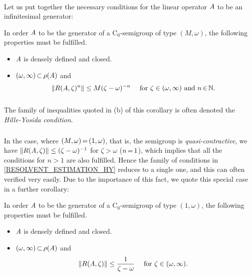 \documentclass[11pt,twoside]{article}
\begin{document}
\paragraph{}
Let us put together the necessary conditions for the linear operator $\mathit{A}$
to be an infinitesimal generator:

\begin{corollary}
In order $\mathit{A}$ to be the generator of a C$_0$-semigroup of type $(M,\omega)$,
the following properties must be fulfilled.

\begin{itemize}[leftmargin=15pt]
\item[(a)]
$\mathit{A}$ is densely defined and closed.
\item[(b)]
$(\omega,\infty) {\,\subset\,} \rho(\mathit{A})$ and
\begin{equation}\label{RESOLVENT_ESTIMATION_HY}
\left\lVert R(\mathit{A},\zeta)^n \right\rVert \leq M (\zeta - \omega)^{-n}
\quad \mbox{ for } \zeta \in (\omega,\infty) \mbox{ and } n {\,\in\,} {\mathbb{N}}.
\end{equation}
\end{itemize}
\end{corollary}

\subparagraph{}
The family of inequalities quoted in (b) of this corollary is often denoted
the \textit{Hille-Yosida condition}.

\subparagraph{}
In the case, where $(M,\omega) {\,=\,} (1,\omega)$,
that is,
the semigroup is \textit{quasi-contractive},
we have $\left\lVert R(\mathit{A},\zeta) \right\rVert \leq (\zeta-\omega)^{-1}$ for $\zeta > \omega$ ($n {\,=\,} 1$),
which implies that all the conditions for $n > 1$ are also fulfilled.
Hence the family of conditions in \eqref{RESOLVENT_ESTIMATION_HY} reduces to
a single one, and this can often verified very easily.
Due to the importance of this fact,
we quote this special case in a further corollary:

\begin{corollary}
In order $\mathit{A}$ to be the generator of a C$_0$-semigroup of type $(1,\omega)$,
the following properties must be fulfilled.

\begin{itemize}[leftmargin=15pt]
\item[(a)]
$\mathit{A}$ is densely defined and closed.
\item[(b)]
$(\omega,\infty) {\,\subset\,} \rho(\mathit{A})$ and
\begin{equation}\label{RESOLVENT_ESTIMATION_HY2}
\left\lVert R(\mathit{A},\zeta) \right\rVert \leq \frac{1}{\zeta - \omega}
\quad \mbox{ for } \zeta \in (\omega,\infty).
\end{equation}
\end{itemize}
\end{corollary}
\end{document}
